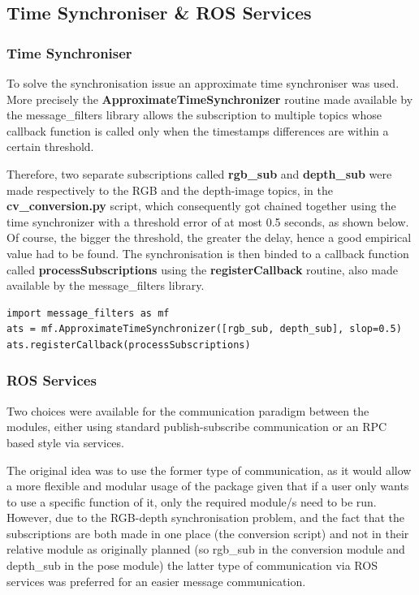 \subsection{Time Synchroniser \& ROS Services}

\subsubsection{Time Synchroniser}

To solve the synchronisation issue an approximate time synchroniser was used. More precisely the \textbf{ApproximateTimeSynchronizer} routine made available by the message\_filters library allows the subscription to multiple topics whose callback function is called only when the timestamps differences are within a certain threshold. 

Therefore, two separate subscriptions called \textbf{rgb\_sub} and \textbf{depth\_sub} were made respectively to the RGB and the depth-image topics, in the \textbf{cv\_conversion.py} script, which consequently got chained together using the time synchronizer with a threshold error of at most 0.5 seconds, as shown below. Of course, the bigger the threshold, the greater the delay, hence a good empirical value had to be found. The synchronisation is then binded to a callback function called \textbf{processSubscriptions} using the \textbf{registerCallback} routine, also made available by the message\_filters library.

\begin{lstlisting}
import message_filters as mf
ats = mf.ApproximateTimeSynchronizer([rgb_sub, depth_sub], slop=0.5)
ats.registerCallback(processSubscriptions)
\end{lstlisting}

\subsubsection{ROS Services}

Two choices were available for the communication paradigm between the modules, either using standard publish-subscribe communication or an RPC based style via services. 

The original idea was to use the former type of communication, as it would allow a more flexible and modular usage of the package given that if a user only wants to use a specific function of it, only the required module/s need to be run. However, due to the RGB-depth synchronisation problem, and the fact that the subscriptions are both made in one place (the conversion script) and not in their relative module as originally planned (so rgb\_sub in the conversion module and depth\_sub in the pose module) the latter type of communication via ROS services was preferred for an easier message communication.

